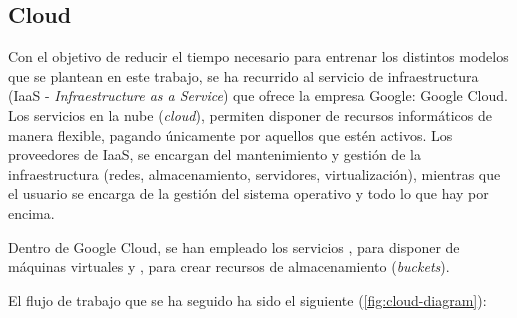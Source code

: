\subsection{Cloud} 

Con el objetivo de reducir el tiempo necesario para entrenar los distintos modelos que se plantean en este trabajo, se ha recurrido al servicio de infraestructura (IaaS - \textit{Infraestructure as a Service}) que ofrece la empresa Google: Google Cloud. Los servicios en la nube (\textit{cloud}), permiten disponer de recursos informáticos de manera flexible, pagando únicamente por aquellos que estén activos. Los proveedores de IaaS, se encargan del mantenimiento y gestión de la infraestructura (redes, almacenamiento, servidores, virtualización), mientras que el usuario se encarga de la gestión del sistema operativo y todo lo que hay por encima. 

Dentro de Google Cloud, se han empleado los servicios , para disponer de máquinas virtuales y , para crear recursos de almacenamiento (\textit{buckets}).

El flujo de trabajo que se ha seguido ha sido el siguiente (\ref{fig:cloud-diagram}):


